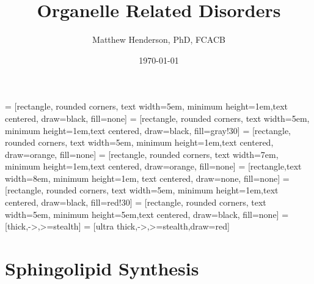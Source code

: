 \documentclass{scrartcl}
\author{Matthew Henderson, PhD, FCACB}
\date{\today}
\title{Organelle Related Disorders}
\begin{document}
\maketitle
\tableofcontents


 = [rectangle, rounded corners, text width=5em, minimum height=1em,text centered, draw=black, fill=none]
 = [rectangle, rounded corners, text width=5em, minimum height=1em,text centered, draw=black, fill=gray!30]
 = [rectangle, rounded corners, text width=5em, minimum height=1em,text centered, draw=orange, fill=none]
 = [rectangle, rounded corners, text width=7em, minimum height=1em,text centered, draw=orange, fill=none]
 = [rectangle,text width=8em, minimum height=1em, text centered, draw=none, fill=none]
 = [rectangle, rounded corners, text width=5em, minimum height=1em,text centered, draw=black, fill=red!30]
 = [rectangle, rounded corners, text width=5em, minimum height=5em,text centered, draw=black, fill=none]
 = [thick,->,>=stealth]
 = [ultra thick,->,>=stealth,draw=red]



\section{Sphingolipid Synthesis}
\label{sec:org926740d}
\end{document}
